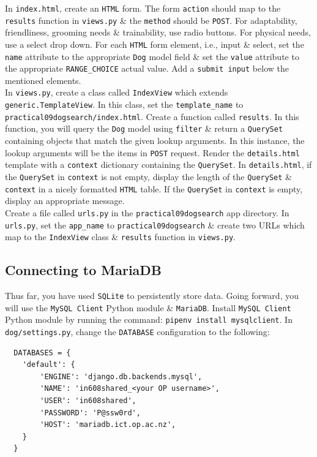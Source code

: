 \documentclass{article}
\begin{document}
In \texttt{index.html}, create an \texttt{HTML} form. The form \texttt{action} should map to the \texttt{results} function in \texttt{views.py} \& the \texttt{method} should be \texttt{POST}. For adaptability, friendliness, grooming needs \& trainability, use radio buttons. For physical needs, use a select drop down. For each \texttt{HTML} form element, i.e., input \& select, set the \texttt{name} attribute to the appropriate \texttt{Dog} model field \& set the \texttt{value} attribute to the appropriate \texttt{RANGE\_CHOICE} actual value. Add a \texttt{submit input} below the mentioned elements. \\

In \texttt{views.py}, create a class called \texttt{IndexView} which extends \texttt{generic.TemplateView}. In this class, set the \texttt{template\_name} to \texttt{practical09dogsearch/index.html}. Create a function called \texttt{results}. In this function, you will query the \texttt{Dog} model using \texttt{filter} \& return a \texttt{QuerySet} containing objects that match the given lookup arguments. In this instance, the lookup arguments will be the items in \texttt{POST} request. Render the \texttt{details.html} template with a \texttt{context} dictionary containing the \texttt{QuerySet}. In \texttt{details.html}, if the \texttt{QuerySet} in \texttt{context} is not empty, display the length of the \texttt{QuerySet} \& \texttt{context} in a nicely formatted \texttt{HTML} table. If the \texttt{QuerySet} in \texttt{context} is empty, display an appropriate message. \\

Create a file called \texttt{urls.py} in the \texttt{practical09dogsearch} app directory. In \texttt{urls.py}, set the \texttt{app\_name} to \texttt{practical09dogsearch} \& create two URLs which map to the \texttt{IndexView} class \& \texttt{results} function in \texttt{views.py}.

\subsection*{Connecting to MariaDB}
Thus far, you have used \texttt{SQLite} to persistently store data. Going forward, you will use the \texttt{MySQL Client} Python module \& \texttt{MariaDB}. Install \texttt{MySQL Client} Python module by running the command: \texttt{pipenv install mysqlclient}. In \texttt{dog/settings.py}, change the \texttt{DATABASE} configuration to the following:

\begin{verbatim}
  DATABASES = {
    'default': {
        'ENGINE': 'django.db.backends.mysql',
        'NAME': 'in608shared_<your OP username>', 
        'USER': 'in608shared', 
        'PASSWORD': 'P@ssw0rd',
        'HOST': 'mariadb.ict.op.ac.nz',
    }
  }
\end{verbatim}
\end{document}
